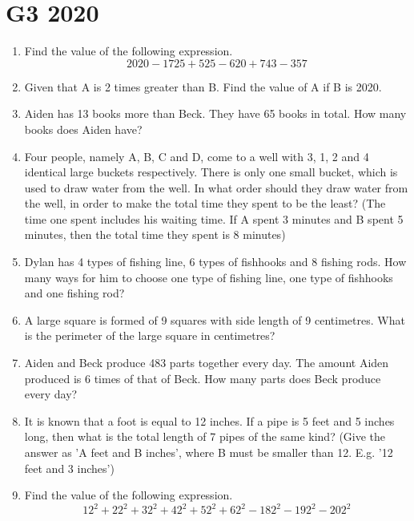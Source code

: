 \documentclass[11pt]{scrartcl}
\begin{document}
\section{G3 2020}
\begin{enumerate}
    \item Find the value of the following expression.
    \[2020 - 1725 + 525 - 620 + 743 - 357\]
    
    \item Given that A is 2 times greater than B. Find the value of A if B is 2020.
    
    \item Aiden has 13 books more than Beck. They have 65 books in total. How many books does Aiden have?
    
    \item Four people, namely A, B, C and D, come to a well with 3, 1, 2 and 4 identical large buckets respectively. There is only one small bucket, which is used to draw water from the well. In what order should they draw water from the well, in order to make the total time they spent to be the least? (The time one spent includes his waiting time. If A spent 3 minutes and B spent 5 minutes, then the total time they spent is 8 minutes)
    
    \item Dylan has 4 types of fishing line, 6 types of fishhooks and 8 fishing rods. How many ways for him to choose one type of fishing line, one type of fishhooks and one fishing rod?
    
    \item A large square is formed of 9 squares with side length of 9 centimetres. What is the perimeter of the large square in centimetres?
    
    \item Aiden and Beck produce 483 parts together every day. The amount Aiden produced is 6 times of that of Beck. How many parts does Beck produce every day?
    
    \item It is known that a foot is equal to 12 inches. If a pipe is 5 feet and 5 inches long, then what is the total length of 7 pipes of the same kind? (Give the answer as 'A feet and B inches', where B must be smaller than 12. E.g. '12 feet and 3 inches')
    
    \item Find the value of the following expression.
    \[12^2 + 22^2 + 32^2 + 42^2 + 52^2 + 62^2 - 182^2 - 192^2 - 202^2\]
    

\end{enumerate}
\end{document}
